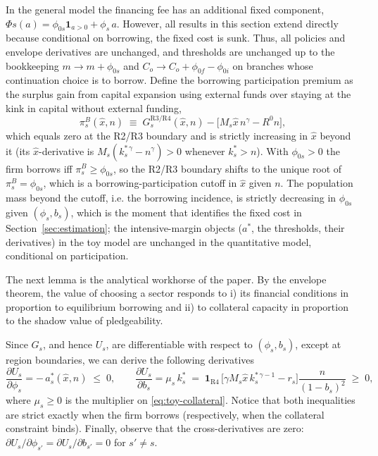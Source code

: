 \documentclass[12pt]{article}
\begin{document}
\begin{remark}
\label{rem:toy-participation}
In the general model the financing fee has an additional fixed component, $\Phi{s}(a)=\phi_{0s}\mathbf{1}_{a>0}+\phi_{s}\,a$. However, all results in this section extend directly because conditional on borrowing, the fixed cost is sunk. Thus, all policies and envelope derivatives are unchanged, and thresholds are unchanged up to the bookkeeping $m \rightarrow m + \phi_{0s}$ and $C_o \rightarrow C_o + \phi_{0f} - \phi_{0i}$ on branches whose continuation choice is to borrow. Define the borrowing participation premium as the surplus gain from capital expansion using external funds over staying at the kink in capital without external funding,
\begin{equation*}
  \pi^{B}_{s}(\hat x,n)\;\equiv\;
  G_{s}^{\mathrm{R3/R4}}(\hat x,n)
  -\big[M_{s}\hat x\,n^{\gamma}-R^0 n\big],
\end{equation*}
which equals zero at the R2/R3 boundary and is strictly increasing in $\hat x$ beyond it (its $\hat x$-derivative is $M_{s}(k^{*\,\gamma}_{s}-n^{\gamma})>0$ whenever $k^{*}_{s}>n$). With $\phi_{0s}>0$ the firm borrows iff $\pi^{B}_{s}\geq\phi_{0s}$, so the R2/R3 boundary shifts to the unique root of $\pi^{B}_{s}=\phi_{0s}$, which is a borrowing-participation cutoff in $\hat x$ given $n$. The population mass beyond the cutoff, i.e. the borrowing incidence, is strictly decreasing in $\phi_{0s}$ given $(\phi_{s},b_{s})$, which is the moment that identifies the fixed cost in Section~\ref{sec:estimation}; the intensive-margin objects ($a^{*}$, the thresholds, their derivatives) in the toy model are unchanged in the quantitative model, conditional on participation.
\end{remark}

The next lemma is the analytical workhorse of the paper. By the envelope theorem, the value of choosing a sector responds to i) its financial conditions in proportion to equilibrium borrowing and ii) to collateral capacity in proportion to the shadow value of pledgeability.
 
\begin{lemma}
\label{lem:envelope}
Since $G_{s}$, and hence $U_{s}$, are differentiable with respect to $(\phi_{s},b_{s})$, except at region boundaries, we can derive the following derivatives
\begin{equation}
  \frac{\partial U_{s}}{\partial \phi_{s}}
  = -\,a^{*}_{s}(\hat x,n)\;\leq\;0,
  \qquad
  \frac{\partial U_{s}}{\partial b_{s}}
  = \mu_{s}\,k^{*}_{s} \;=\;
  \mathbf{1}_{\mathrm{R4}}\,
  \Big[\gamma M_{s}\hat x\,k^{*\,\gamma-1}_{s}-r_{s}\Big]
  \frac{n}{(1- b_{s})^{2}}\;\geq\;0,
  \label{eq:toy-envelope}
\end{equation}
where $\mu_{s}\geq0$ is the multiplier on \eqref{eq:toy-collateral}. Notice that both inequalities are strict exactly when the firm borrows (respectively, when the collateral constraint binds). Finally, observe that the cross-derivatives are zero: $\partial U_{s}/\partial\phi_{s'}=\partial U_{s}/\partial b_{s'}=0$ for $s'\neq s$.
\end{lemma}
\end{document}

